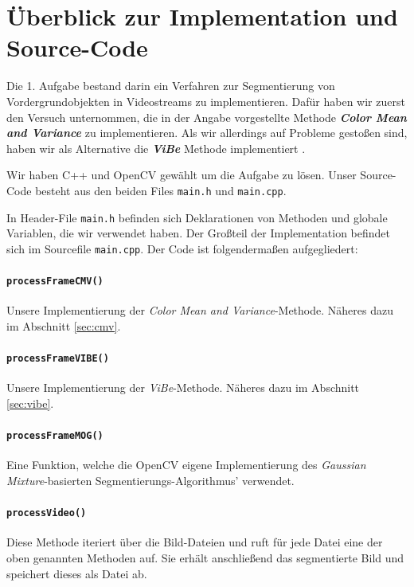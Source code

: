 \documentclass[]{scrartcl}
\begin{document}
\maketitle

\section{\"Uberblick zur Implementation und Source-Code}
Die 1. Aufgabe bestand darin ein Verfahren zur Segmentierung von Vordergrundobjekten in Videostreams zu implementieren. Daf\"ur haben wir zuerst den Versuch unternommen, die in der Angabe vorgestellte Methode \textbf{\textit{Color Mean and Variance}} zu implementieren. Als wir allerdings auf Probleme gesto\ss{}en sind, haben wir als Alternative die \textbf{\textit{ViBe}} Methode implementiert \cite{barnich2011vibe}.

Wir haben C++ und OpenCV gew\"ahlt um die Aufgabe zu l\"osen. Unser Source-Code besteht aus den beiden Files \texttt{main.h} und \texttt{main.cpp}.

In Header-File \texttt{main.h} befinden sich Deklarationen von Methoden und globale Variablen, die wir verwendet haben. Der Gro\ss{}teil der Implementation befindet sich im Sourcefile \texttt{main.cpp}. Der Code ist folgendermaßen aufgegliedert:

\paragraph{\texttt{processFrameCMV()}} Unsere Implementierung der \textit{Color Mean and Variance}-Methode. N\"aheres dazu im Abschnitt \ref{sec:cmv}.

\paragraph{\texttt{processFrameVIBE()}} Unsere Implementierung der \textit{ViBe}-Methode. N\"aheres dazu im Abschnitt \ref{sec:vibe}.

\paragraph{\texttt{processFrameMOG()}} Eine Funktion, welche die OpenCV eigene Implementierung des \textit{Gaussian Mixture}-basierten Segmentierungs-Algorithmus' verwendet.

\paragraph{\texttt{processVideo()}} Diese Methode iteriert \"uber die Bild-Dateien und ruft f\"ur jede Datei eine der oben genannten Methoden auf. Sie erh\"alt anschlie\ss{}end das segmentierte Bild und speichert dieses als Datei ab.
\end{document}
